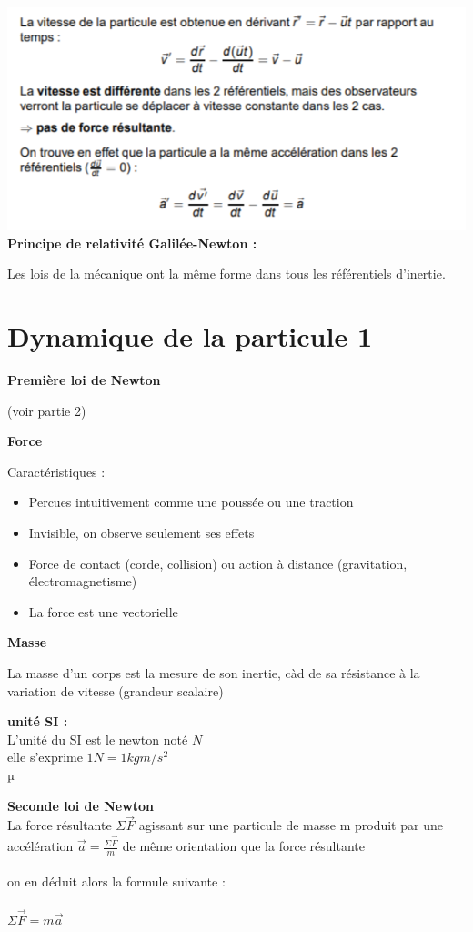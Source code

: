 \documentclass[]{article}
\begin{document}
\includegraphics[scale=1]{transformation_gal_2}\\

\noindent \textbf{Principe de relativité Galilée-Newton :}

Les lois de la mécanique ont la même forme dans tous les référentiels d'inertie.
\newpage
\part{Dynamique de la particule 1}
\textbf{Première loi de Newton}

(voir partie 2)

\noindent \textbf{Force}

Caractéristiques :
\begin{itemize}
  \item Percues intuitivement comme une poussée ou une traction
  \item Invisible, on observe seulement ses effets
  \item Force de contact (corde, collision) ou action à distance (gravitation, électromagnetisme)
  \item La force est une vectorielle
\end{itemize}

\noindent \textbf{Masse}

La masse d'un corps est la mesure de son inertie, càd de sa résistance à la variation de vitesse (grandeur scalaire)

\textbf{unité SI :}\\
\indent \indent L'unité du SI est le newton noté $N$\\
\indent \indent elle s'exprime $1N = 1kg m/s^2$\\µ

\noindent \textbf{Seconde loi de Newton}\\

La force résultante $\Sigma \overrightarrow{F}$ agissant sur une particule de masse m produit par une accélération $\overrightarrow{a}=\frac{\Sigma \overrightarrow{F}}{m}$ de même orientation que la force résultante\\\\

on en déduit alors la formule suivante :\\\\
\indent \indent $\Sigma \overrightarrow{F} = m\overrightarrow{a}$
\end{document}
